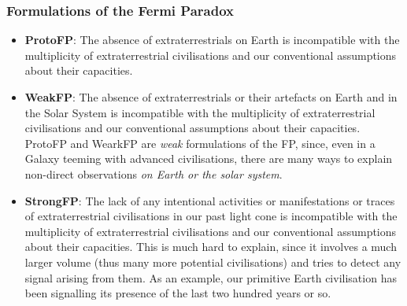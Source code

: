 \begin{frame}
\frametitle{Formulations of the Fermi Paradox}
\begin{itemize}
\item {\bf ProtoFP}: The absence of extraterrestrials on Earth is incompatible with the multiplicity of extraterrestrial civilisations and our conventional assumptions about their capacities. 
\item {\bf WeakFP}: The absence of extraterrestrials or their artefacts on Earth and in the Solar System is incompatible with the multiplicity of extraterrestrial civilisations and our conventional assumptions about their capacities. ProtoFP and WearkFP are {\em weak} formulations of the FP, since, even in a Galaxy teeming with advanced civilisations, there are many ways to explain non-direct observations {\em on Earth or the solar system}.
\item {\bf StrongFP}: The lack of any intentional activities or manifestations or traces of extraterrestrial civilisations in our past light cone is incompatible with the multiplicity of extraterrestrial civilisations and our conventional assumptions about their capacities. This is much hard to explain, since it involves a much larger volume (thus many more potential civilisations) and tries to detect any signal arising from them. As an example, our primitive Earth civilisation has been signalling its presence of the last two hundred years or so. 
\end{itemize}

\end{frame}

